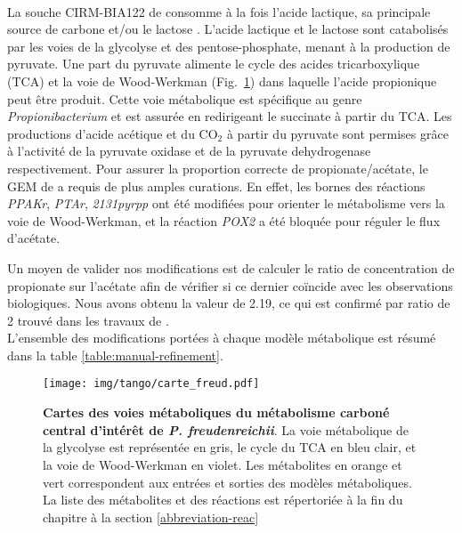 \paragraph*{\freud}

La souche CIRM-BIA122 de \freud consomme à la fois l'acide lactique, sa principale source de carbone \citep*{Thierry2011,Dank2021} et/ou le lactose \citep{Loux2015}. L'acide lactique et le lactose sont catabolisés par les voies de la glycolyse et des pentose-phosphate, menant à la production de pyruvate. Une part du pyruvate alimente le cycle des acides  tricarboxylique (TCA) et la voie de Wood-Werkman  (Fig.~\ref{figure:metabolic_map_freud}) dans laquelle l'acide propionique peut être produit. Cette voie métabolique est spécifique au genre \textit{Propionibacterium} et est assurée en redirigeant le succinate à partir du TCA. Les productions d'acide acétique et du CO$_2$ \citep{Turgay2020} à partir du pyruvate sont permises grâce à l'activité de la pyruvate oxidase et de la pyruvate dehydrogenase respectivement. Pour assurer la proportion correcte de propionate/acétate, le GEM de \freud a requis de plus amples curations. En effet, les bornes des réactions \textit{PPAKr}, \textit{PTAr}, \textit{2131pyrpp} ont été modifiées pour orienter le métabolisme vers la voie de  Wood-Werkman, et la réaction \textit{POX2} a été bloquée pour réguler le flux d'acétate.

Un moyen de valider nos modifications est de calculer le ratio de concentration de propionate sur l'acétate afin de vérifier si ce dernier coïncide avec les observations biologiques. Nous avons obtenu la valeur de 2.19, ce qui est confirmé par ratio de 2 trouvé dans les travaux de  \citep*{Crow1986,Dank2021,Cao2021, Turgay2020}. \\ 

L'ensemble des modifications portées à chaque modèle métabolique est résumé dans la table \ref{table:manual-refinement}.

\begin{figure}[H]
    \centering
    \texttt{[image: img/tango/carte\_freud.pdf]}
    \caption{\textbf{Cartes des voies métaboliques du métabolisme carboné central  d'intérêt de \textit{P. freudenreichii}}. La voie métabolique de la glycolyse est représentée en gris, le cycle du TCA en bleu clair, et la voie de Wood-Werkman en violet. Les métabolites en orange et vert correspondent aux entrées et sorties des modèles métaboliques. La liste des métabolites et des réactions est répertoriée à la fin du chapitre à la section \ref{abbreviation-reac}}
    \label{figure:metabolic_map_freud}
\end{figure}



